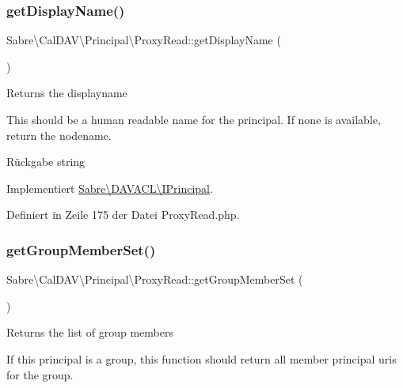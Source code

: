 \subsubsection{\texorpdfstring{get\+Display\+Name()}{getDisplayName()}}
{\footnotesize\ttfamily Sabre\textbackslash{}\+Cal\+D\+A\+V\textbackslash{}\+Principal\textbackslash{}\+Proxy\+Read\+::get\+Display\+Name (\begin{DoxyParamCaption}{ }\end{DoxyParamCaption})}

Returns the displayname

This should be a human readable name for the principal. If none is available, return the nodename.

\begin{DoxyReturn}{Rückgabe}
string 
\end{DoxyReturn}


Implementiert \mbox{\hyperlink{interface_sabre_1_1_d_a_v_a_c_l_1_1_i_principal_aff7f7f00c81458d5d9e20e28f4d32461}{Sabre\textbackslash{}\+D\+A\+V\+A\+C\+L\textbackslash{}\+I\+Principal}}.



Definiert in Zeile 175 der Datei Proxy\+Read.\+php.

\mbox{\label{class_sabre_1_1_cal_d_a_v_1_1_principal_1_1_proxy_read_a397ef7443da29e867f986b0fd1c498d6}} 
\subsubsection{\texorpdfstring{get\+Group\+Member\+Set()}{getGroupMemberSet()}}
{\footnotesize\ttfamily Sabre\textbackslash{}\+Cal\+D\+A\+V\textbackslash{}\+Principal\textbackslash{}\+Proxy\+Read\+::get\+Group\+Member\+Set (\begin{DoxyParamCaption}{ }\end{DoxyParamCaption})}

Returns the list of group members

If this principal is a group, this function should return all member principal uri\textquotesingle{}s for the group.

